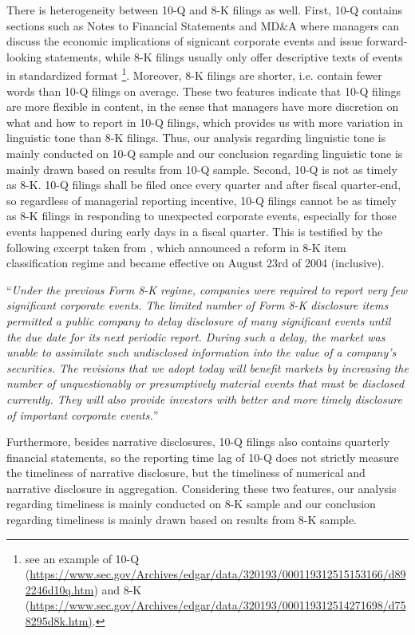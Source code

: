 \documentclass[a4paper]{article}
\begin{document}
\begin{spacing}{2}
There is heterogeneity between 10-Q and 8-K filings as well. First, 10-Q contains sections such as Notes to Financial Statements and MD\&A where managers can discuss the economic implications of signicant corporate events and issue forward-looking statements, while 8-K filings usually only offer descriptive texts of events in standardized format \footnote{see an example of 10-Q (\url{https://www.sec.gov/Archives/edgar/data/320193/000119312515153166/d892246d10q.htm}) and 8-K (\url{https://www.sec.gov/Archives/edgar/data/320193/000119312514271698/d758295d8k.htm)}.}. Moreover, 8-K filings are shorter, i.e. contain fewer words than 10-Q filings on average. These two features indicate that 10-Q filings are more flexible in content, in the sense that managers have more discretion on what and how to report in 10-Q filings, which provides us with more variation in linguistic tone than 8-K filings. Thus, our analysis regarding linguistic tone is mainly conducted on 10-Q sample and our conclusion regarding linguistic tone is mainly drawn based on results from 10-Q sample. Second, 10-Q is not as timely as 8-K. 10-Q filings shall be filed once every quarter and after fiscal quarter-end, so regardless of managerial reporting incentive, 10-Q filings cannot be as timely as 8-K filings in responding to unexpected corporate events, especially for those events happened during early days in a fiscal quarter. This is testified by the following excerpt taken from \cite{secFinalRuleAdditional2004}, which announced a reform in 8-K item classification regime and became effective on August 23rd of 2004 (inclusive).

“\textit{Under the previous Form 8-K regime, companies were required to report very few significant corporate events. The limited number of Form 8-K disclosure items permitted a public company to delay disclosure of many significant events until the due date for its next periodic report. During such a delay, the market was unable to assimilate such undisclosed information into the value of a company's securities. The revisions that we adopt today will benefit markets by increasing the number of unquestionably or presumptively material events that must be disclosed currently. They will also provide investors with better and more timely disclosure of important corporate events.}”

Furthermore, besides narrative disclosures, 10-Q filings also contains quarterly financial statements, so the reporting time lag of 10-Q does not strictly measure the timeliness of narrative disclosure, but the timeliness of numerical and narrative disclosure in aggregation. Considering these two features, our analysis regarding timeliness is mainly conducted on 8-K sample and our conclusion regarding timeliness is mainly drawn based on results from 8-K sample.


\end{spacing}
\end{document}
